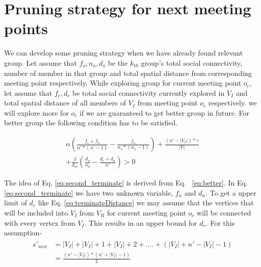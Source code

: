 \documentclass{vldb}
\begin{document}
		\section{Pruning strategy for next meeting points}
		We can develop some pruning strategy when we have already found relevant group. Let assume that $ f_o, n_o, d_o $ be the $ k_{th} $ group's total social connectivity, number of member in that group and total spatial distance from corresponding meeting point respectively. While exploring group for current meeting point $ o_{c} $, let assume that $ f_{c}, d_{c} $ be total social connectivity currently explored in $ V_I $  and total spatial distance of  all members of $ V_I $ from meeting point $ o_{c} $ respectively. we will explore more for $ o_{c} $ if we are guaranteed to get better group in future. For better group the following condition has to be satisfied. 
		
		
		\begin{equation}
		\label{eq:second_terminate}
		\begin{split}
		\alpha \left(\frac{f_{c}+f_n}{n'*(n'-1)}-\frac{f_o}{n_o*(n_o-1)}\right)+
		\frac{(n'-|V_I|)*\gamma}{|V|}
		\\		 	
		+\frac{\beta}{d_{m}}\left(\frac{d_o}{n_o} -\frac{d_{c}+d_n}{n'}\right)	> 0 	
		\end{split}
		\end{equation}
		
		The idea of Eq. \eqref{eq:second_terminate} is derived from Eq. ~\eqref{eq:better}.
		In Eq. \eqref{eq:second_terminate} we have two unknown variable, $ f_n $ and $ d_n $. To get a upper limit of $ d_{e} $ like Eq. \eqref{eq:terminateDistance} we may assume that the vertices that will be included into $ V_I $ from $ V_R $ for current meeting point $ o_{c} $ will be connected with every vertex from $ V_I $. This results in an upper bound for $ d_{e} $. For this assumption-
		\begin{equation*}
		\begin{split}
				\begin{aligned}
				s'_{new}&=|V_I|+|V_I|+1+|V_I|+2+....+(|V_I|+n'-|V_I|-1) 
				\\
				 &= \frac{(n'-|V_I|)*(n'+|V_I|-1)}{2} 		
				\end{aligned}
		\end{split}
		\end{equation*}
	
\end{document}
